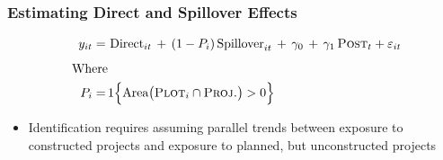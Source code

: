 \documentclass[aspectratio=32]{beamer}
\begin{document}
\begin{frame}
\frametitle{Estimating Direct and Spillover Effects}

\centering



\begin{align*}
\quad y_{it}  =\,& \, \text{Direct}_{it} \, + \, (1- P_i)  \, \text{Spillover}_{it} \,+\, \gamma_0 \,+\, \gamma_1 \, \textsc{Post}_t + \varepsilon_{it} \\[.5em]
\text{Where} & \\
P_i =\,& 1\Big\{\text{Area}\big(\textsc{Plot}_i  \cap  \textsc{Proj.}\big)>0\Big \}\,
\end{align*}

\begin{itemize}
\item Identification requires assuming parallel trends between exposure to constructed projects and exposure to planned, but unconstructed projects
\end{itemize}
\end{frame}
\end{document}
